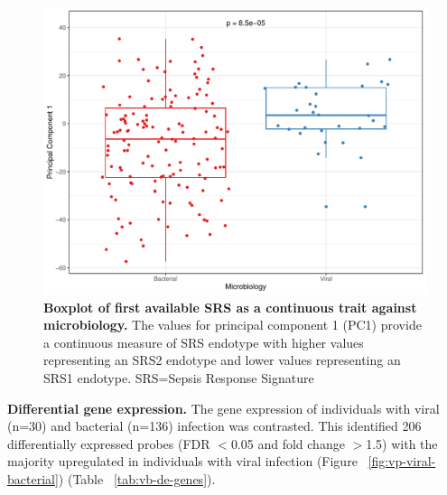 \FloatBarrier
\begin{figure}[htbp]
\centering
\includegraphics[width=\textwidth]{./Results3/Images/viralSRS2.pdf}
\caption[Microbiology and SRS status]{\textbf{Boxplot of first available SRS as a continuous trait against microbiology.} The values for principal component 1 (PC1) provide a continuous measure of SRS endotype with higher values representing an SRS2 endotype and lower values representing an SRS1 endotype. SRS=Sepsis Response Signature}
\label{fig:viralsrs2}
\end{figure}
\FloatBarrier

\textbf{Differential gene expression.} The gene expression of individuals with viral (n=30) and bacterial (n=136) infection was contrasted. This identified 206 differentially expressed probes (FDR $<$0.05 and fold change $>$1.5) with the majority upregulated in individuals with viral infection (Figure ~\ref{fig:vp-viral-bacterial}) (Table ~\ref{tab:vb-de-genes}). 

